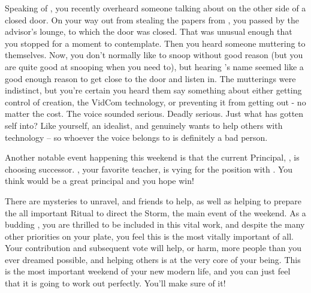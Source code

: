 \documentclass[char]{GL2020}
\begin{document}
Speaking of \cTechStar{}, you recently overheard someone talking about  \cTechStar{\them} on the other side of a closed door. On your way out from stealing the papers from \cBunker{}, you passed by the advisor's lounge, to which the door was closed. That was unusual enough that you stopped for a moment to contemplate. Then you heard someone muttering to themselves. Now, you don't normally like to snoop without good reason (but you are quite good at snooping when you need to), but hearing \cTechStar{}'s name seemed like a good enough reason to get close to the door and listen in. The mutterings were indistinct, but you're certain you heard them say something about either getting control of \cTechStar{\their} creation, the VidCom technology, or preventing it from getting out - no matter the cost. The voice sounded serious. Deadly serious. Just what has \cTechStar{\they} gotten \cTechStar{\their}self into? Like yourself, \cTechStar{\they} \cTechStar{\are} an idealist, and genuinely wants to help others with \cTechStar{\their} technology – so whoever the voice belongs to is definitely a bad person.

Another notable event happening this weekend is that the current Principal, \cPrincipal{}, is choosing \cPrincipal{\their} successor. \cMusic{\full}, your favorite teacher, is vying for the position with \cBeetle{\full}. You think \cMusic{} would be a great principal and you hope \cMusic{\they} win\cMusic{\plural}!

There are mysteries to unravel, and friends to help, as well as helping to prepare the all important Ritual to direct the Storm, the main event of the weekend.  As a budding \cDisney{\cleric}, you are thrilled to be included in this vital work, and despite the many other priorities on your plate, you feel this is the most vitally important of all. Your contribution and subsequent vote will help, or harm, more people than you ever dreamed possible, and helping others is at the very core of your being. This is the most important weekend of your new modern life, and you can just feel that it is going to work out perfectly. You'll make sure of it!
\end{document}

